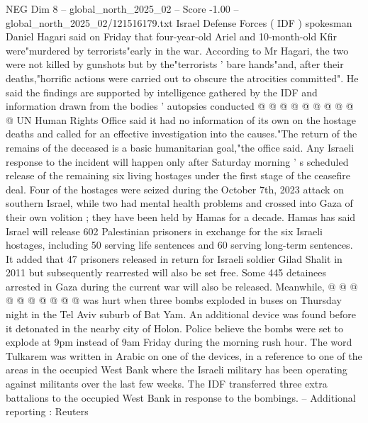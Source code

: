 \begin{textsample}{NEG Dim 8 – global\_north\_2025\_02 – Score -1.00 – global\_north\_2025\_02/121516179.txt}
Israel Defense Forces ( IDF ) spokesman Daniel Hagari said on Friday that four-year-old Ariel and 10-month-old Kfir were"murdered by terrorists"early in the war.
According to Mr Hagari, the two were not killed by gunshots but by the"terrorists ' bare hands"and, after their deaths,"horrific actions were carried out to obscure the atrocities committed".
He said the findings are supported by intelligence gathered by the IDF and information drawn from the bodies ' autopsies conducted @ @ @ @ @ @ @ @ @ @ UN Human Rights Office said it had no information of its own on the hostage deaths and called for an effective investigation into the causes."The return of the remains of the deceased is a basic humanitarian goal,"the office said.
Any Israeli response to the incident will happen only after Saturday morning ' s scheduled release of the remaining six living hostages under the first stage of the ceasefire deal.
Four of the hostages were seized during the October 7th, 2023 attack on southern Israel, while two had mental health problems and crossed into Gaza of their own volition ; they have been held by Hamas for a decade.
Hamas has said Israel will release 602 Palestinian prisoners in exchange for the six Israeli hostages, including 50 serving life sentences and 60 serving long-term sentences.
It added that 47 prisoners released in return for Israeli soldier Gilad Shalit in 2011 but subsequently rearrested will also be set free.
Some 445 detainees arrested in Gaza during the current war will also be released.
Meanwhile, @ @ @ @ @ @ @ @ @ @ was hurt when three bombs exploded in buses on Thursday night in the Tel Aviv suburb of Bat Yam.
An additional device was found before it detonated in the nearby city of Holon.
Police believe the bombs were set to explode at 9pm instead of 9am Friday during the morning rush hour.
The word Tulkarem was written in Arabic on one of the devices, in a reference to one of the areas in the occupied West Bank where the Israeli military has been operating against militants over the last few weeks.
The IDF transferred three extra battalions to the occupied West Bank in response to the bombings. -- Additional reporting : Reuters

\end{textsample}
